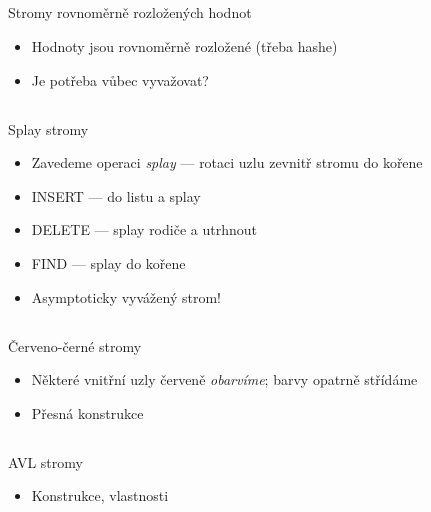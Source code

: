\documentclass{beamer}
\begin{document}
\subsection{}
\begin{frame}{Stromy rovnoměrně rozložených hodnot}
\begin{itemize}
\item Hodnoty jsou rovnoměrně rozložené (třeba hashe)
\item Je potřeba vůbec vyvažovat?
\end{itemize}
\end{frame}

\subsection{}
\begin{frame}{Splay stromy}
\begin{itemize}
\item Zavedeme operaci {\em splay} --- rotaci uzlu zevnitř stromu do kořene
\item INSERT --- do listu a splay
\item DELETE --- splay rodiče a utrhnout
\item FIND --- splay do kořene
\item Asymptoticky vyvážený strom!
\end{itemize}
\end{frame}

\subsection{}
\begin{frame}{Červeno-černé stromy}
\begin{itemize}
\item Některé vnitřní uzly červeně {\em obarvíme}; barvy opatrně střídáme
\item Přesná konstrukce
\end{itemize}
\end{frame}

\subsection{}
\begin{frame}{AVL stromy}
\begin{itemize}
\item Konstrukce, vlastnosti
\end{itemize}
\end{frame}
\end{document}
